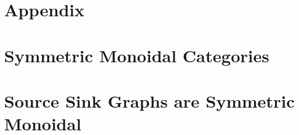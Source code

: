 \documentclass{llncs}
\begin{document}



\appendix

\section*{Appendix}
\label{sec:appendix}
\section{Symmetric Monoidal Categories}
\label{sec:symmetric_monoidal_categories}


\section{Source Sink Graphs are Symmetric Monoidal}
\label{sec:source_sink_graphs_are_symmetric_monoidal}

\end{document}
